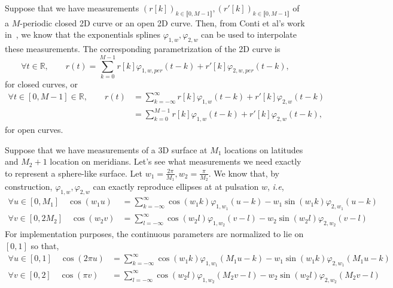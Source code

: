 Suppose that we have measurements ${(r[k])}_{k \in \llbracket0,M-1\rrbracket}, {(r'[k])}_{k \in 
\llbracket0,M-1\rrbracket}$ of a $M$-periodic closed 2D curve or an open 2D curve. Then, from Conti et al's work 
in~\cite{conti_ellipse-preserving_2015}, we know that the exponentials splines $\varphi_{1,w}, \varphi_{2,w}$ can be 
used to interpolate these measurements. The corresponding parametrization of the 2D curve is
\begin{equation*}
  \forall t \in \mathbb{R}, \qquad  r(t) = \sum_{k=0}^{M-1} r[k] \varphi_{1,w,per}(t-k) + r'[k] \varphi_{2,w,per}(t-k),
\end{equation*}
for closed curves, or 
\begin{align*}
  \forall t \in [0, M-1] \in \mathbb{R}, \qquad r(t) &= \sum_{k=-\infty}^{\infty} r[k] \varphi_{1,w}(t-k) + r'[k] 
  \varphi_{2, w}(t-k) \\
  & = \sum_{k=0}^{M-1} r[k] \varphi_{1,w}(t-k) + r'[k] \varphi_{2, w}(t-k),
\end{align*}
for open curves. 

Suppose that we have measurements of a 3D surface at $M_1$ locations on latitudes and $M_2+1$ location on meridians.  
Let's see what measurements we need exactly to represent a sphere-like surface. Let $w_1 = \frac{2\pi}{M_1}, w_2 = 
\frac{\pi}{M_2}$.  We know that, by construction, $\varphi_{1,w}, \varphi_{2,w}$ can exactly reproduce ellipses at at 
pulsation $w$, \textit{i.e},
\begin{align*}
  \forall u \in [0, M_1] \quad \cos(w_1u) &= \sum_{k=-\infty}^{\infty} \cos (w_1k) \varphi_{1, w_1}(u-k) - w_1 \sin (w_1k) 
  \varphi_{2, w_1} (u-k) \\
  \forall v \in [0, 2M_2] \quad \cos(w_2v) &= \sum_{l=-\infty}^{\infty} \cos (w_2l) \varphi_{1, w_2}(v-l) - w_2 \sin (w_2l) 
\varphi_{2, w_2} (v-l) \end{align*}
For implementation purposes, the continuous parameters are normalized to lie on $[0,1]$ so that,
\begin{align*}
  \forall u \in [0, 1] \quad \cos(2\pi u) &= \sum_{k=-\infty}^{\infty} \cos (w_1k) \varphi_{1, w_1}(M_1u-k) - w_1 \sin 
  (w_1k) \varphi_{2, w_1} (M_1u-k) \\
  \forall v \in [0, 2] \quad \cos(\pi v) &= \sum_{l=-\infty}^{\infty} \cos (w_2l) \varphi_{1, w_2}(M_2v-l) - w_2 \sin 
  (w_2l)
\varphi_{2, w_2} (M_2v-l)
\end{align*}

